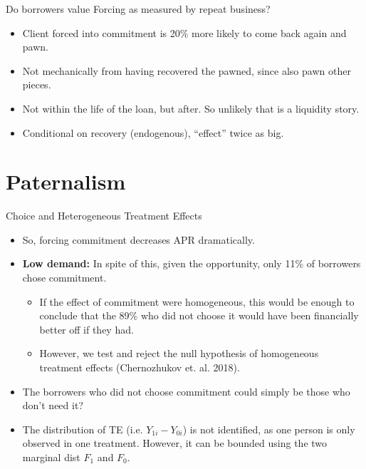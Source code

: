 \documentclass[8pt]{beamer}
\begin{document}
\begin{frame}{Do borrowers value Forcing as measured by repeat business?}

\vspace{.2in}
\begin{table}[H]
\begin{center}
\footnotesize{}
\end{center}
\end{table}    
\begin{itemize}
    \item Client forced into commitment is 20\% more likely to come back again and pawn.
    \item Not mechanically from having recovered the pawned, since also pawn other pieces.
    \item Not within the life of the loan, but after. So unlikely that is a liquidity story.
    \item Conditional on recovery (endogenous), ``effect'' twice as big.
\end{itemize}

\end{frame}








\section{Paternalism}
\begin{frame}{Choice and Heterogeneous Treatment Effects}
\label{choice_hte}
    \begin{itemize}
    \vfill \item  So, forcing commitment decreases APR dramatically. 
    
    \vfill \item \textbf{Low demand:} In spite of this, given the opportunity, only 11\% of borrowers chose commitment.   
    \begin{itemize}
       \pause \item If the effect of commitment were homogeneous, this would be enough to conclude that the 89\% who did not choose it would have been financially better off if they had.
       \item However, we test and reject the null hypothesis of homogeneous treatment effects (Chernozhukov et. al. 2018).
    \end{itemize}
    
    \vfill \item The borrowers who did not choose commitment could simply be those who don’t need it?
    \pause \vfill \item The distribution of TE (i.e. $Y_{1i}-Y_{0i}$) is not identified, as one person is only observed in one treatment. However, it can be bounded using the two marginal dist $F_1$ and $F_0$. 

    \end{itemize}
\end{frame}
\end{document}
